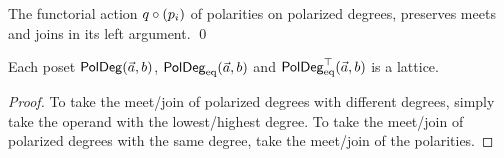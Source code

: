 \documentclass[a4paper]{memoir}
\begin{document}
\begin{corollary} \label{thm:pol-poldeg-lattice}
	The functorial action $q \circ ({p}_{i})$ of polarities on polarized degrees, preserves meets and joins in its left argument. \qed
\end{corollary}
\begin{proposition} \label{thm:poldeg-lattice}
	Each poset $\mathsf{PolDeg}(\vec a, b)$, $\mathsf{PolDeg}_{\mathrm{eq}}(\vec a, b)$ and $\mathsf{PolDeg}_{\mathrm{eq}}^\top(\vec a, b)$ is a lattice.
\end{proposition}
\begin{proof}
	To take the meet/join of polarized degrees with different degrees, simply take the operand with the lowest/highest degree.
	To take the meet/join of polarized degrees with the same degree, take the meet/join of the polarities.
\end{proof}
\end{document}
